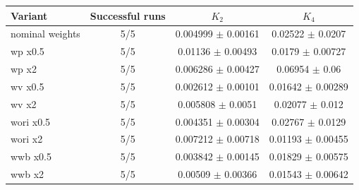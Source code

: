 \begin{tabular}{lccc}
\toprule
Variant & Successful runs & $K_2$ & $K_4$ \\
\midrule
nominal weights & 5/5 & 0.004999 $\pm$ 0.00161 & 0.02522 $\pm$ 0.0207 \\
wp x0.5 & 5/5 & 0.01136 $\pm$ 0.00493 & 0.0179 $\pm$ 0.00727 \\
wp x2 & 5/5 & 0.006286 $\pm$ 0.00427 & 0.06954 $\pm$ 0.06 \\
wv x0.5 & 5/5 & 0.002612 $\pm$ 0.00101 & 0.01642 $\pm$ 0.00289 \\
wv x2 & 5/5 & 0.005808 $\pm$ 0.0051 & 0.02077 $\pm$ 0.012 \\
wori x0.5 & 5/5 & 0.004351 $\pm$ 0.00304 & 0.02767 $\pm$ 0.0129 \\
wori x2 & 5/5 & 0.007212 $\pm$ 0.00718 & 0.01193 $\pm$ 0.00455 \\
wwb x0.5 & 5/5 & 0.003842 $\pm$ 0.00145 & 0.01829 $\pm$ 0.00575 \\
wwb x2 & 5/5 & 0.00509 $\pm$ 0.00366 & 0.01543 $\pm$ 0.00642 \\
\bottomrule
\end{tabular}
